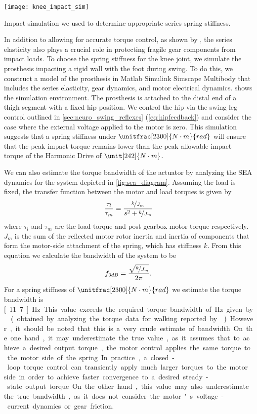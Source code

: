 \begin{marginfigure}[2.5in]
    \centering 
    \texttt{[image: knee\_impact\_sim]}
    \caption{Impact simulation we used to determine appropriate series spring
    stiffness.}\label{fig:knee_impact_sim}
\end{marginfigure}
In addition to allowing for accurate torque control, as shown by
\citet{au2007biomechanical,au2008powered}, the series elasticity also plays a
crucial role in protecting fragile gear components from impact loads. To choose
the spring stiffness for the knee joint, we simulate the prosthesis impacting a
rigid wall with the foot during swing. To do this, we construct a model of the
prosthesis in Matlab Simulink Simscape Multibody that includes the series
elasticity, gear dynamics, and motor electrical dynamics.
 shows the simulation environment. The prosthesis is
attached to the distal end of a thigh segment with a fixed hip position. We
control the hip via the swing leg control outlined in
\cref{sec:neuro_swing_reflexes} (\cref{eq:hipfeedback}) and consider the case
where the external voltage applied to the motor is zero. This simulation
suggests that a spring stiffness under $\unitfrac[2300]{N \cdot m}{rad}$ will
ensure that the peak impact torque remains lower than the peak allowable impact
torque of the Harmonic Drive of $\unit[242]{N \cdot m}$.

We can also estimate the torque bandwidth of the actuator by analyzing the SEA
dynamics for the system depicted in \cref{fig:sea_diagram}. Assuming the load is fixed, the transfer function between the motor
and load torques is given by
\begin{align}
    \frac{\tau_l}{\tau_m} = \frac{\nicefrac{k}{J_m}}{s^2 + \nicefrac{k}{J_m}}
\end{align}
where $\tau_l$ and $\tau_m$ are the load torque and post-gearbox motor torque
respectively. $J_m$ is the sum of the reflected motor rotor inertia and inertia
of components that form the motor-side attachment of the spring, which has
stiffness $k$. From this equation we calculate the bandwidth of the system
to be
\begin{align}
    f_{3 dB} = \frac{\sqrt{\nicefrac{k}{J_m}}}{2 \pi}.
\end{align}
For a spring stiffness of $\unitfrac[2300]{N \cdot m}{rad}$ we estimate the
torque bandwidth is \unit[11.7]{Hz}. This value exceeds the required torque
bandwidth of \unit[4]{Hz} given by \citet{sergi2012design} (obtained by
analyzing the torque data for walking reported by
\citet{winter2009biomechanics}). However, it should be noted that this is a very
crude estimate of bandwidth. On the one hand, it may underestimate the true
value, as it assumes that to achieve a desired output torque, the motor control
applies the same torque to the motor side of the spring. In practice, a
closed-loop torque control can transiently apply much larger torques to the
motor side in order to achieve faster convergence to a desired steady-state
output torque. On the other hand, this value may also underestimate the true
bandwidth, as it does not consider the motor's voltage-current dynamics or gear
friction.


